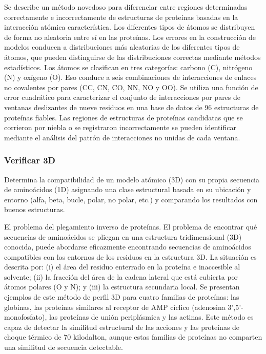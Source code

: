 \documentclass[11pt, letterpaper, spanish]{article}
\begin{document}
{{{\par{Se describe un método novedoso para diferenciar entre regiones determinadas correctamente e incorrectamente de estructuras de proteínas basadas en la interacción atómica característica. Los diferentes tipos de átomos se distribuyen de forma no aleatoria entre sí en las proteínas. Los errores en la construcción de modelos conducen a distribuciones más aleatorias de los diferentes tipos de átomos, que pueden distinguirse de las distribuciones correctas mediante métodos estadísticos. Los átomos se clasifican en tres categorías: carbono (C), nitrógeno (N) y oxígeno (O). Eso conduce a seis combinaciones de interacciones de enlaces no covalentes por pares (CC, CN, CO, NN, NO y OO). Se utiliza una función de error cuadrático para caracterizar el conjunto de interacciones por pares de ventanas deslizantes de nueve residuos en una base de datos de 96 estructuras de proteínas fiables. Las regiones de estructuras de proteínas candidatas que se corrieron por niebla o se registraron incorrectamente se pueden identificar mediante el análisis del patrón de interacciones no unidas de cada ventana.}

\subsubsection{Verificar 3D}
\par{Determina la compatibilidad de un modelo atómico (3D) con su propia secuencia de aminoácidos (1D) asignando una clase estructural basada en su ubicación y entorno (alfa, beta, bucle, polar, no polar, etc.) y comparando los resultados con buenos estructuras.}
\par{El problema del plegamiento inverso de proteínas. El problema de encontrar qué secuencias de aminoácidos se pliegan en una estructura tridimensional (3D) conocida, puede abordarse eficazmente encontrando secuencias de aminoácidos compatibles con los entornos de los residuos en la estructura 3D. La situación es descrita por:
(i) el área del residuo enterrado en la proteína e inaccesible al solvente;
(ii) la fracción del área de la cadena lateral que está cubierta por átomos polares (O y N); y
(iii) la estructura secundaria local.
Se presentan ejemplos de este método de perfil 3D para cuatro familias de proteínas: las globinas, las proteínas similares al receptor de AMP cíclico (adenosina 3',5'-monofosfato), las proteínas de unión periplásmica y las actinas. Este método es capaz de detectar la similitud estructural de las acciones y las proteínas de choque térmico de 70 kilodalton, aunque estas familias de proteínas no comparten una similitud de secuencia detectable.}

}}}
\end{document}
